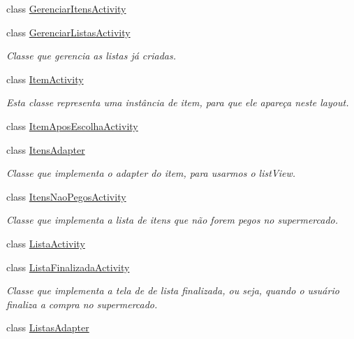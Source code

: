 \begin{DoxyCompactItemize}
class \mbox{\hyperlink{classbr_1_1unb_1_1cic_1_1mp_1_1marketmaster_1_1GerenciarItensActivity}{Gerenciar\+Itens\+Activity}}
\item 
class \mbox{\hyperlink{classbr_1_1unb_1_1cic_1_1mp_1_1marketmaster_1_1GerenciarListasActivity}{Gerenciar\+Listas\+Activity}}
\begin{DoxyCompactList}\small\item\em Classe que gerencia as listas já criadas. \end{DoxyCompactList}\item 
class \mbox{\hyperlink{classbr_1_1unb_1_1cic_1_1mp_1_1marketmaster_1_1ItemActivity}{Item\+Activity}}
\begin{DoxyCompactList}\small\item\em Esta classe representa uma instância de item, para que ele apareça neste layout. \end{DoxyCompactList}\item 
class \mbox{\hyperlink{classbr_1_1unb_1_1cic_1_1mp_1_1marketmaster_1_1ItemAposEscolhaActivity}{Item\+Apos\+Escolha\+Activity}}
\item 
class \mbox{\hyperlink{classbr_1_1unb_1_1cic_1_1mp_1_1marketmaster_1_1ItensAdapter}{Itens\+Adapter}}
\begin{DoxyCompactList}\small\item\em Classe que implementa o adapter do item, para usarmos o list\+View. \end{DoxyCompactList}\item 
class \mbox{\hyperlink{classbr_1_1unb_1_1cic_1_1mp_1_1marketmaster_1_1ItensNaoPegosActivity}{Itens\+Nao\+Pegos\+Activity}}
\begin{DoxyCompactList}\small\item\em Classe que implementa a lista de itens que não forem pegos no supermercado. \end{DoxyCompactList}\item 
class \mbox{\hyperlink{classbr_1_1unb_1_1cic_1_1mp_1_1marketmaster_1_1ListaActivity}{Lista\+Activity}}
\item 
class \mbox{\hyperlink{classbr_1_1unb_1_1cic_1_1mp_1_1marketmaster_1_1ListaFinalizadaActivity}{Lista\+Finalizada\+Activity}}
\begin{DoxyCompactList}\small\item\em Classe que implementa a tela de de lista finalizada, ou seja, quando o usuário finaliza a compra no supermercado. \end{DoxyCompactList}\item 
class \mbox{\hyperlink{classbr_1_1unb_1_1cic_1_1mp_1_1marketmaster_1_1ListasAdapter}{Listas\+Adapter}}

\end{DoxyCompactItemize}
